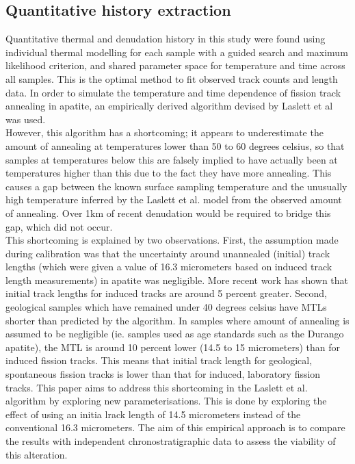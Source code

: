 \documentclass[11pt, oneside]{article}   	%
\begin{document}
\subsection{Quantitative history extraction}
Quantitative thermal and denudation history in this study were found using individual thermal modelling for each sample with a guided search and maximum likelihood criterion, and shared parameter space for temperature and time across all samples. This is the optimal method to fit observed track counts and length data. In order to simulate the temperature and time dependence of fission track annealing in apatite, an empirically derived algorithm devised by Laslett et al was used. 
\\However, this algorithm has a shortcoming; it appears to underestimate the amount of annealing at temperatures lower than 50 to 60 degrees celsius, so that samples at temperatures below this are falsely implied to have actually been at temperatures higher than this due to the fact they have more annealing. This causes a gap between the known surface sampling temperature and the unusually high temperature inferred by the Laslett et al. model from the observed amount of annealing. Over 1km of recent denudation would be required to bridge this gap, which did not occur.  
\\This shortcoming is explained by two observations. First, the assumption made during calibration  was that the uncertainty around unannealed (initial) track lengths (which were given a value of 16.3 micrometers based on induced track length measurements) in apatite was negligible. More recent work has shown that initial track lengths for induced tracks are around 5 percent greater. 
Second, geological samples which have remained under 40 degrees celsius have MTLs shorter than predicted by the algorithm. In samples where amount of annealing is assumed to be negligible (ie. samples used as age standards such as the Durango apatite), the MTL is around 10 percent lower (14.5 to 15 micrometers) than for induced fission tracks. This means that initial track length for geological, spontaneous fission tracks is lower than that for induced, laboratory fission tracks. 
This paper aims to address this shortcoming in the Laslett et al. algorithm by exploring new parameterisations. This is done by exploring the effect of using an initia lrack length of 14.5 micrometers instead of the conventional 16.3 micrometers. The aim of this empirical approach is to compare the results with independent chronostratigraphic data to assess the viability of this alteration. 
\end{document}
